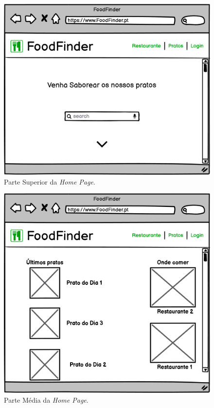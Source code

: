\documentclass[a4paper,12pt]{report}
\begin{document}
	\begin{figure}[H]
	\begin{center}
	\includegraphics[scale=0.60]{Screen_Home}	
	\end{center}
	\caption{Parte Superior da \textit{Home Page}.}
	\label{fig:Screen_Home}	
	\end{figure} 
	
	\begin{figure}[H]
	\begin{center}
	\includegraphics[scale=0.60]{Screen_HomePage_Down}	
	\end{center}
	\caption{Parte Média da \textit{Home Page}.}
	\label{fig:Screen_HomePage_Down}	
	\end{figure} 
	
\end{document}

